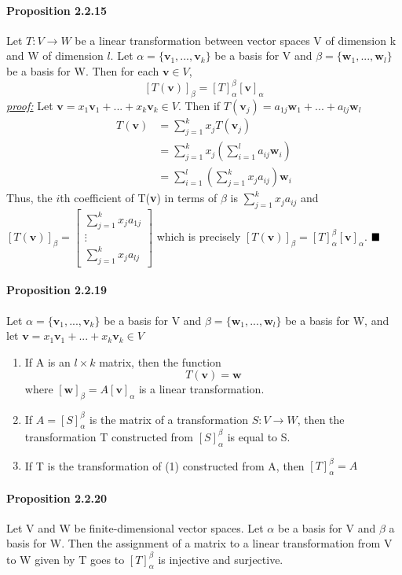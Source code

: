 \documentclass[11pt]{article}
\newcommand{\tb}[1]{\textbf{#1}}
\newcommand{\proof}[0]{\textit{\underline{proof:} }}
\newcommand{\litran}[0]{$T: V \rightarrow W$ }
\newcommand{\qed}[0]{$\hfill\blacksquare$}
\begin{document}
{\paragraph{Proposition 2.2.15} Let \litran be a linear transformation between vector spaces V of dimension k and W of dimension $l$. Let $\alpha = \{\tb{v}_1,...,\tb{v}_k\}$ be a basis for V and $\beta = \{\tb{w}_1,...,\tb{w}_l\}$ be a basis for W. Then for each $\tb{v} \in V$, $$[T(\tb{v})]_\beta = [T]^\beta_\alpha[\tb{v}]_\alpha$$
\proof Let $\tb{v} = x_1\tb{v}_1 + ...+x_k\tb{v}_k \in V$. Then if $T(\tb{v}_j) = a_{1j}\tb{w}_1 + ...+ a_{lj}\tb{w}_l$
\begin{align*}
	T(\tb{v}) &= \sum_{j=1}^kx_jT(\tb{v}_j)\\
	&=\sum_{j=1}^kx_j(\sum_{i=1}^la_{ij}\tb{w}_i)\\
	&=\sum_{i=1}^l(\sum_{j=1}^kx_ja_{ij})\tb{w}_i
\end{align*}
Thus, the $i$th coefficient of T(\tb{v}) in terms of $\beta$ is $\sum_{j=1}^kx_ja_{ij}$ and 
$[T(\tb{v})]_\beta = \begin{bmatrix}
	\sum_{j=1}^kx_ja_{1j}\\
	\vdots\\
	\sum_{j=1}^kx_ja_{lj}
\end{bmatrix}$ which is precisely $[T(\tb{v})]_\beta = [T]^\beta_\alpha[\tb{v}]_\alpha$. \qed

\paragraph{Proposition 2.2.19} 
 Let $\alpha = \{\tb{v}_1,...,\tb{v}_k\}$ be a basis for V and $\beta = \{\tb{w}_1,...,\tb{w}_l\}$ be a basis for W, and let $\tb{v} = x_1\tb{v}_1 +...+x_k\tb{v}_k \in V$
 \begin{enumerate}
 	\item If A is an $l \times k$ matrix, then the function $$T(\tb{v}) = \tb{w}$$
 	where $[\tb{w}]_\beta = A[\tb{v}]_\alpha$ is a linear transformation.
 	\item If $A = [S]_\alpha^\beta$ is the matrix of a transformation $S: V \rightarrow W$, then the transformation T constructed from $[S]_\alpha^\beta$ is equal to S.
 	\item If T is the transformation of (1) constructed from A, then $[T]_\alpha^\beta = A$
 \end{enumerate}
 
 \paragraph{Proposition 2.2.20} Let V and W be finite-dimensional vector spaces. Let $\alpha$ be a basis for V and $\beta$ a basis for W. Then the assignment of a matrix to a linear transformation from V to W given by T goes to $[T]_\alpha^\beta$ is injective and surjective.
}
\end{document}
